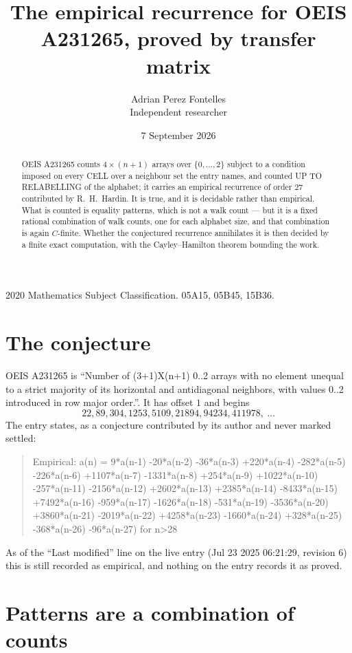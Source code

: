 \documentclass[11pt,a4paper]{article}
\title{The empirical recurrence for OEIS A231265, proved by transfer matrix}
\author{Adrian Perez Fontelles\\ \small Independent researcher}
\date{7 September 2026}
\theoremstyle{plain}
\theoremstyle{definition}
\begin{document}
\maketitle

\begin{abstract}
OEIS A231265 counts $4\times(n+1)$ arrays over $\{0,\dots,2\}$ subject to a condition imposed on
every CELL over a neighbour set the entry names, and counted UP TO RELABELLING of the
alphabet; it carries an empirical recurrence of order $27$ contributed by
R.~H.~Hardin. It is true, and it is decidable rather than empirical. What is counted is
equality patterns, which is not a walk count --- but it is a fixed rational combination of
walk counts, one for each alphabet size, and that combination is again $C$-finite. Whether the
conjectured recurrence annihilates it is then decided by a finite exact computation, with the
Cayley--Hamilton theorem bounding the work.
\end{abstract}

\noindent\small 2020 Mathematics Subject Classification. 05A15, 05B45, 15B36.\normalsize

\section{The conjecture}

OEIS A231265 is ``Number of (3+1)X(n+1) 0..2 arrays with no element unequal to a strict majority of its horizontal and antidiagonal neighbors, with values 0..2 introduced in row major order.''. It has offset $1$ and begins
\[
22, 89, 304, 1253, 5109, 21894, 94234, 411978,\ \dots
\]
The entry states, as a conjecture contributed by its author and never marked settled:
\begin{quote}
Empirical: a(n) = 9*a(n-1) -20*a(n-2) -36*a(n-3) +220*a(n-4) -282*a(n-5) -226*a(n-6) +1107*a(n-7) -1331*a(n-8) +254*a(n-9) +1022*a(n-10) -257*a(n-11) -2156*a(n-12) +2602*a(n-13) +2385*a(n-14) -8433*a(n-15) +7492*a(n-16) -959*a(n-17) -1626*a(n-18) -531*a(n-19) -3536*a(n-20) +3860*a(n-21) -2019*a(n-22) +4258*a(n-23) -1660*a(n-24) +328*a(n-25) -368*a(n-26) -96*a(n-27) for n>28
\end{quote}
As of the ``Last modified'' line on the live entry (Jul 23 2025 06:21:29, revision 6) this is still
recorded as empirical, and nothing on the entry records it as proved.

\section{Patterns are a combination of counts}
\end{document}
